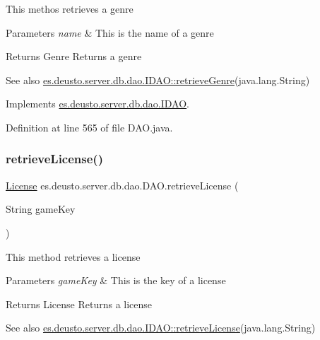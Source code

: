 This methos retrieves a genre 
\begin{DoxyParams}{Parameters}
{\em name} & This is the name of a genre \\
\hline
\end{DoxyParams}
\begin{DoxyReturn}{Returns}
Genre Returns a genre 
\end{DoxyReturn}
\begin{DoxySeeAlso}{See also}
\hyperlink{interfacees_1_1deusto_1_1server_1_1db_1_1dao_1_1_i_d_a_o_a8b15955637f9b81c57900761c6d03571}{es.\+deusto.\+server.\+db.\+dao.\+I\+D\+A\+O\+::retrieve\+Genre}(java.\+lang.\+String) 
\end{DoxySeeAlso}


Implements \hyperlink{interfacees_1_1deusto_1_1server_1_1db_1_1dao_1_1_i_d_a_o_a8b15955637f9b81c57900761c6d03571}{es.\+deusto.\+server.\+db.\+dao.\+I\+D\+AO}.



Definition at line 565 of file D\+A\+O.\+java.

\mbox{\label{classes_1_1deusto_1_1server_1_1db_1_1dao_1_1_d_a_o_a02fd634e6bd7a087b1476ab161af646f}} 
\subsubsection{\texorpdfstring{retrieve\+License()}{retrieveLicense()}}
{\footnotesize\ttfamily \hyperlink{classes_1_1deusto_1_1server_1_1db_1_1data_1_1_license}{License} es.\+deusto.\+server.\+db.\+dao.\+D\+A\+O.\+retrieve\+License (\begin{DoxyParamCaption}\item[{String}]{game\+Key }\end{DoxyParamCaption})}

This method retrieves a license 
\begin{DoxyParams}{Parameters}
{\em game\+Key} & This is the key of a license \\
\hline
\end{DoxyParams}
\begin{DoxyReturn}{Returns}
License Returns a license 
\end{DoxyReturn}
\begin{DoxySeeAlso}{See also}
\hyperlink{interfacees_1_1deusto_1_1server_1_1db_1_1dao_1_1_i_d_a_o_a6a3e25055d4a81c738d1bd73de6ef7da}{es.\+deusto.\+server.\+db.\+dao.\+I\+D\+A\+O\+::retrieve\+License}(java.\+lang.\+String) 
\end{DoxySeeAlso}


